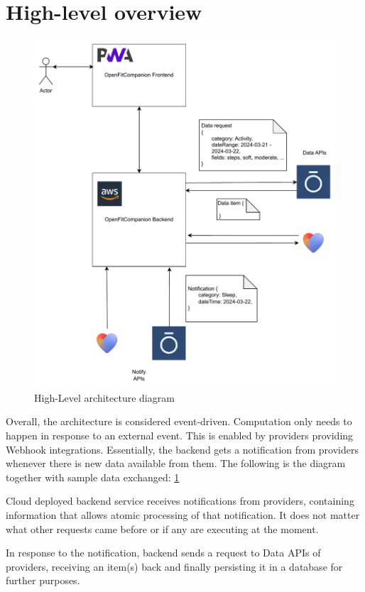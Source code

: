 \section{High-level overview}
\begin{figure}
    \centering
    \includegraphics[width=\textwidth,height=\textheight,keepaspectratio]{images/highLevel.pdf}
    \caption{High-Level architecture diagram}
    \label{fig:1}
\end{figure}
Overall, the architecture is considered event-driven. Computation only needs to happen in response to an external event. This is enabled by providers providing Webhook integrations. Essentially, the backend gets a notification from providers whenever there is new data available from them. The following is the diagram together with sample data exchanged: \ref{fig:1}

Cloud deployed backend service receives notifications from providers, containing information that allows atomic processing of that notification. It does not matter what other requests came before or if any are executing at the moment. 

In response to the notification, backend sends a request to Data APIs of providers, receiving an item(s) back and finally persisting it in a database for further purposes. 

